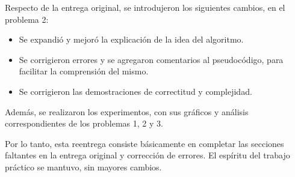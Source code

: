Respecto de la entrega original, se introdujeron los siguientes cambios, en el problema 2:

\begin{itemize}
\item Se expandió y mejoró la explicación de la idea del algoritmo.

\item Se corrigieron errores y se agregaron comentarios al pseudocódigo, para
facilitar la comprensión del mismo.

\item Se corrigieron las demostraciones de correctitud y complejidad.

\end{itemize}

Además, se realizaron los experimentos, con sus gráficos y análisis correspondientes 
de los problemas 1, 2 y 3.

Por lo tanto, esta reentrega consiste básicamente en completar las secciones
faltantes en la entrega original y corrección de errores. El espíritu del trabajo 
práctico se mantuvo, sin mayores cambios.

